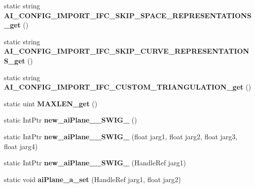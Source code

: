 \begin{DoxyCompactItemize}
\item 
\hypertarget{class_assimp_p_i_n_v_o_k_e_a18658c779dbf7946c49ac4322c323aa3}{static string {\bfseries A\+I\+\_\+\+C\+O\+N\+F\+I\+G\+\_\+\+I\+M\+P\+O\+R\+T\+\_\+\+I\+F\+C\+\_\+\+S\+K\+I\+P\+\_\+\+S\+P\+A\+C\+E\+\_\+\+R\+E\+P\+R\+E\+S\+E\+N\+T\+A\+T\+I\+O\+N\+S\+\_\+get} ()}\label{class_assimp_p_i_n_v_o_k_e_a18658c779dbf7946c49ac4322c323aa3}

\item 
\hypertarget{class_assimp_p_i_n_v_o_k_e_a060549d553fd6808077592cb020f808c}{static string {\bfseries A\+I\+\_\+\+C\+O\+N\+F\+I\+G\+\_\+\+I\+M\+P\+O\+R\+T\+\_\+\+I\+F\+C\+\_\+\+S\+K\+I\+P\+\_\+\+C\+U\+R\+V\+E\+\_\+\+R\+E\+P\+R\+E\+S\+E\+N\+T\+A\+T\+I\+O\+N\+S\+\_\+get} ()}\label{class_assimp_p_i_n_v_o_k_e_a060549d553fd6808077592cb020f808c}

\item 
\hypertarget{class_assimp_p_i_n_v_o_k_e_ab7fbd079be409f9cb328ec30308987d6}{static string {\bfseries A\+I\+\_\+\+C\+O\+N\+F\+I\+G\+\_\+\+I\+M\+P\+O\+R\+T\+\_\+\+I\+F\+C\+\_\+\+C\+U\+S\+T\+O\+M\+\_\+\+T\+R\+I\+A\+N\+G\+U\+L\+A\+T\+I\+O\+N\+\_\+get} ()}\label{class_assimp_p_i_n_v_o_k_e_ab7fbd079be409f9cb328ec30308987d6}

\item 
\hypertarget{class_assimp_p_i_n_v_o_k_e_a2a4fb68be335efe13f4e6c0f9399ccee}{static uint {\bfseries M\+A\+X\+L\+E\+N\+\_\+get} ()}\label{class_assimp_p_i_n_v_o_k_e_a2a4fb68be335efe13f4e6c0f9399ccee}

\item 
\hypertarget{class_assimp_p_i_n_v_o_k_e_a9770ff2bff6cd4bba06e1992fe075609}{static Int\+Ptr {\bfseries new\+\_\+ai\+Plane\+\_\+\+\_\+\+S\+W\+I\+G\+\_} ()}\label{class_assimp_p_i_n_v_o_k_e_a9770ff2bff6cd4bba06e1992fe075609}

\item 
\hypertarget{class_assimp_p_i_n_v_o_k_e_a51d3ec5d679510e7e8d5502d92c92ffd}{static Int\+Ptr {\bfseries new\+\_\+ai\+Plane\+\_\+\+\_\+\+S\+W\+I\+G\+\_} (float jarg1, float jarg2, float jarg3, float jarg4)}\label{class_assimp_p_i_n_v_o_k_e_a51d3ec5d679510e7e8d5502d92c92ffd}

\item 
\hypertarget{class_assimp_p_i_n_v_o_k_e_a123d6ba0888962809557e6ae3a5ffaec}{static Int\+Ptr {\bfseries new\+\_\+ai\+Plane\+\_\+\+\_\+\+S\+W\+I\+G\+\_} (Handle\+Ref jarg1)}\label{class_assimp_p_i_n_v_o_k_e_a123d6ba0888962809557e6ae3a5ffaec}

\item 
\hypertarget{class_assimp_p_i_n_v_o_k_e_a8aba973f3ed86578ca1fc3e79e5928b8}{static void {\bfseries ai\+Plane\+\_\+a\+\_\+set} (Handle\+Ref jarg1, float jarg2)}\label{class_assimp_p_i_n_v_o_k_e_a8aba973f3ed86578ca1fc3e79e5928b8}


\end{DoxyCompactItemize}
